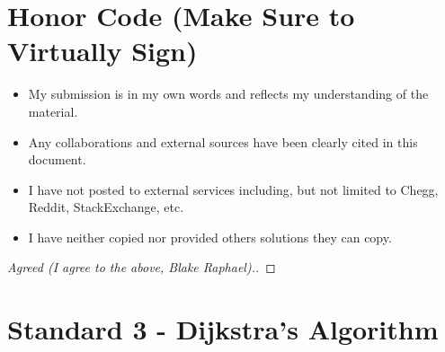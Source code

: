 \documentclass[11pt]{article}
\theoremstyle{definition}
\theoremstyle{definition}
\newtheorem{required}{Problem}
\theoremstyle{definition}
\begin{document}
\section{Honor Code (Make Sure to Virtually Sign)} \label{HonorCode}

\begin{itemize}
\item My submission is in my own words and reflects my understanding of the material.
\item Any collaborations and external sources have been clearly cited in this document.
\item I have not posted to external services including, but not limited to Chegg, Reddit, StackExchange, etc.
\item I have neither copied nor provided others solutions they can copy.
\end{itemize}


\begin{proof}[Agreed (I agree to the above, Blake Raphael).]
\end{proof}

\newpage
\section{Standard 3 - Dijkstra's Algorithm}
\end{document}
